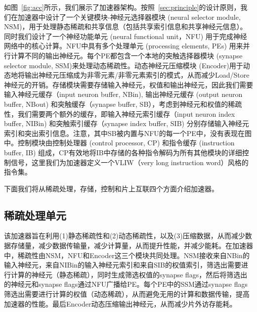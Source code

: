 如图~\ref{fig:acc}所示，我们展示了加速器架构。按照~\ref{sec:principle}的设计原则，我们在加速器中设计了一个关键模块-神经元选择器模块 (neural selector module, NSM)，用于处理静态稀疏和共享信息（包括共享索引信息和共享神经元信息）。同时我们设计了一个神经功能单元 (neural functional unit，NFU) 用于完成神经网络中的核心计算。NFU中具有多个处理单元 (processing elements, PEs) 用来并行计算不同的输出神经元。每个PE都包含一个本地的突触选择器模块 (synapse selector module, SSM)来处理动态稀疏性。动态神经元压缩模块 (Encoder)用于动态地将输出神经元压缩成为非零元素/非零元素索引的模式，从而减少Load/Store神经元的开销。存储模块需要存储输入神经元，权值和输出神经元，因此我们需要输入神经元缓存（input neuron buffer, NBin), 输出神经元缓存 (output neuron buffer, NBout) 和突触缓存（synapse buffer, SB），考虑到神经元和权值的稀疏性，我们需要两个额外的缓存，即输入神经元索引缓存（input neuron index buffer, NIBin) 和突触索引缓存（synapse index buffer, SIB) 分别存储输入神经元索引和突出索引信息。注意，其中SB被内置与NFU的每一个PE中，没有表现在图中。控制模块由控制处理器 (control processor, CP) 和指令缓存 (instruction buffer, IB) 组成，CP有效地将IB中存储的各种指令解码为所有其他模块的详细控制信号，这里我们为加速器定义一个VLIW（very long instruction word）风格的指令集。

下面我们将从稀疏处理，存储，控制和片上互联四个方面介绍加速器。

\subsection{稀疏处理单元}
该加速器旨在利用(1)静态稀疏性和(2)动态稀疏性，以及(3)压缩数据，从而减少数据存储量，减少数据传输量，减少计算量，从而提升性能，并减少能耗。在加速器中，稀疏性由NSM，NFU和Encoder这三个模块共同处理。NSM接收来自NBin的输入神经元，来自NIBin的输入神经元索引和来自SIB的权值索引，筛选出需要进行计算的神经元（静态稀疏），同时生成筛选权值的synapse flags，然后将筛选出的神经元和synapse flags通过NFU广播给PE。每个PE中的SSM通过synapse flags筛选出需要进行计算的权值（动态稀疏），从而避免无用的计算和数据传输，提高加速器的性能。最后Encoder动态压缩输出神经元，从而减少片外访存能耗。

